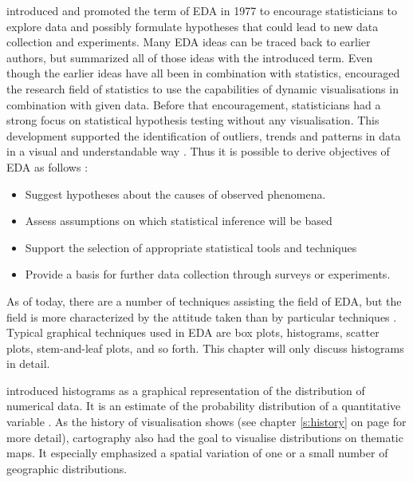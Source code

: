 \citeauthor{Tukey1977} introduced and promoted the term of \ac{EDA} in 1977 to encourage statisticians to explore data and possibly formulate hypotheses that could lead to new data collection and experiments. Many \ac{EDA} ideas can be traced back to earlier authors, but \citeauthor{Tukey1977} summarized all of those ideas with the introduced term. Even though the earlier ideas have all been in combination with statistics, \citeauthor{Tukey1977} encouraged the research field of statistics to use the capabilities of dynamic visualisations in combination with given data. Before that encouragement, statisticians had a strong focus on statistical hypothesis testing without any visualisation. This development supported the identification of outliers, trends and patterns in data in a visual and understandable way . Thus it is possible to derive objectives of \ac{EDA} as follows :

\begin{itemize}

\item Suggest hypotheses about the causes of observed phenomena.
\item Assess assumptions on which statistical inference will be based
\item Support the selection of appropriate statistical tools and techniques
\item Provide a basis for further data collection through surveys or experiments.

\end{itemize}

As of today, there are a number of techniques assisting the field of \ac{EDA}, but the field is more characterized by the attitude taken than by particular techniques . Typical graphical techniques used in \ac{EDA} are box plots, histograms, scatter plots, stem-and-leaf plots, and so forth. This chapter will only discuss histograms in detail.

\citeauthor{Pearson1895} introduced histograms as a graphical representation of the distribution of numerical data. It is an estimate of the probability distribution of a quantitative variable . As the history of visualisation shows (see chapter \ref{s:history} on page \pageref{s:history} for more detail), cartography also had the goal to visualise distributions on thematic maps. It especially emphasized a spatial variation of one or a small number of geographic distributions.


